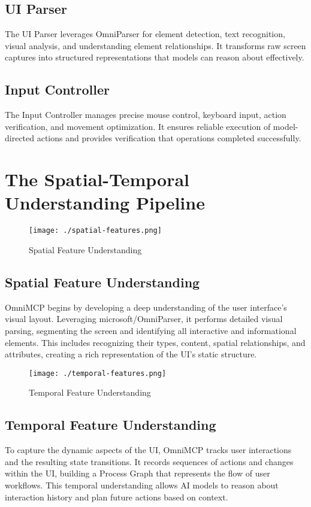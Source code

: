 \documentclass{article}
\begin{document}
\subsection{UI Parser}
The UI Parser leverages OmniParser for element detection, text recognition, visual analysis, and understanding element relationships. It transforms raw screen captures into structured representations that models can reason about effectively.

\subsection{Input Controller}
The Input Controller manages precise mouse control, keyboard input, action verification, and movement optimization. It ensures reliable execution of model-directed actions and provides verification that operations completed successfully.

\section{The Spatial-Temporal Understanding Pipeline}

\begin{figure}[h]
\centering
\texttt{[image: ./spatial-features.png]}
\caption{Spatial Feature Understanding}
\label{fig:spatial}
\end{figure}

\subsection{Spatial Feature Understanding}
OmniMCP begins by developing a deep understanding of the user interface's visual layout. Leveraging microsoft/OmniParser, it performs detailed visual parsing, segmenting the screen and identifying all interactive and informational elements. This includes recognizing their types, content, spatial relationships, and attributes, creating a rich representation of the UI's static structure.

\begin{figure}[h]
\centering
\texttt{[image: ./temporal-features.png]}
\caption{Temporal Feature Understanding}
\label{fig:temporal}
\end{figure}

\subsection{Temporal Feature Understanding}
To capture the dynamic aspects of the UI, OmniMCP tracks user interactions and the resulting state transitions. It records sequences of actions and changes within the UI, building a Process Graph that represents the flow of user workflows. This temporal understanding allows AI models to reason about interaction history and plan future actions based on context.
\end{document}
